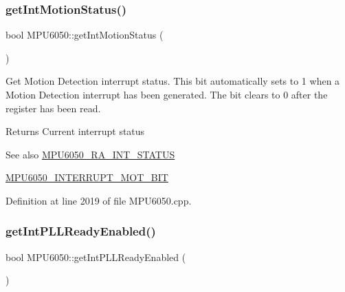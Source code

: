 \subsubsection{\texorpdfstring{getIntMotionStatus()}{getIntMotionStatus()}}
{\footnotesize\ttfamily bool M\+P\+U6050\+::get\+Int\+Motion\+Status (\begin{DoxyParamCaption}{ }\end{DoxyParamCaption})}

Get Motion Detection interrupt status. This bit automatically sets to 1 when a Motion Detection interrupt has been generated. The bit clears to 0 after the register has been read. \begin{DoxyReturn}{Returns}
Current interrupt status 
\end{DoxyReturn}
\begin{DoxySeeAlso}{See also}
\mbox{\hyperlink{MPU6050_8h_a8337320c5ccc92def830e968d2e19d75}{M\+P\+U6050\+\_\+\+R\+A\+\_\+\+I\+N\+T\+\_\+\+S\+T\+A\+T\+US}} 

\mbox{\hyperlink{MPU6050_8h_a510f9a47269818529f7dc7f7d5e662ae}{M\+P\+U6050\+\_\+\+I\+N\+T\+E\+R\+R\+U\+P\+T\+\_\+\+M\+O\+T\+\_\+\+B\+IT}} 
\end{DoxySeeAlso}


Definition at line 2019 of file M\+P\+U6050.\+cpp.


\begin{DoxyCode}{0}

\end{DoxyCode}
\mbox{\label{classMPU6050_a4d02c38682aa566b6204df3f81fbcb68}} 
\subsubsection{\texorpdfstring{getIntPLLReadyEnabled()}{getIntPLLReadyEnabled()}}
{\footnotesize\ttfamily bool M\+P\+U6050\+::get\+Int\+P\+L\+L\+Ready\+Enabled (\begin{DoxyParamCaption}{ }\end{DoxyParamCaption})}



